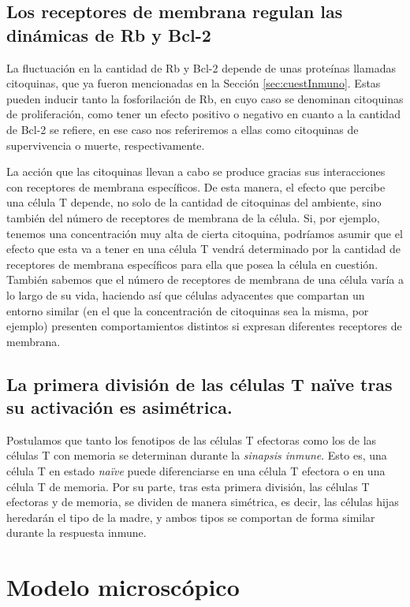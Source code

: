 \subsection{Los receptores de membrana regulan las dinámicas de Rb y Bcl-2}
\label{sub:hip_recep}

La fluctuación en la cantidad de Rb y Bcl-2 depende de unas proteínas llamadas citoquinas, que ya fueron mencionadas en la Sección \ref{sec:cuestInmuno}. Estas pueden inducir tanto la fosforilación de Rb, en cuyo caso se denominan citoquinas de proliferación, como tener un efecto positivo o negativo en cuanto a la cantidad de Bcl-2 se refiere, en ese caso nos referiremos a ellas como citoquinas de supervivencia o muerte, respectivamente.

La acción que las citoquinas llevan a cabo se produce gracias sus interacciones con receptores de membrana específicos. De esta manera, el efecto que percibe una célula T depende, no solo de la cantidad de citoquinas del ambiente, sino también del número de receptores de membrana de la célula. Si, por ejemplo, tenemos una concentración muy alta de cierta citoquina, podríamos asumir que el efecto que esta va a tener en una célula T vendrá determinado por la cantidad de receptores de membrana específicos para ella que posea la célula en cuestión. También sabemos que el número de receptores de membrana de una célula varía a lo largo de su vida, haciendo así que células adyacentes que compartan un entorno similar (en el que la concentración de citoquinas sea la misma, por ejemplo) presenten comportamientos distintos si expresan diferentes receptores de membrana.

\subsection{La primera división de las células T naïve tras su activación es asimétrica.}
\label{sub:hip_divAsim}

Postulamos que tanto los fenotipos de las células T efectoras como los de las células T con memoria se determinan durante la \textit{sinapsis inmune}. Esto es, una célula T en estado \textit{naïve} puede diferenciarse en una célula T efectora o en una célula T de memoria. Por su parte, tras esta primera división, las células T efectoras y de memoria, se dividen de manera simétrica, es decir, las células hijas heredarán el tipo de la madre, y ambos tipos se comportan de forma similar durante la respuesta inmune.

\section{Modelo microscópico}
\label{sec:modelo}

